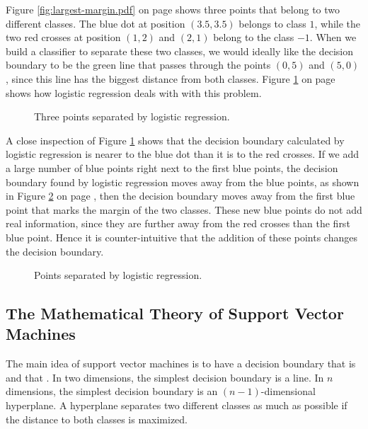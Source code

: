 Figure \ref{fig:largest-margin.pdf} on page \pageref{fig:largest-margin.pdf} shows three points that belong to
two different classes.  The blue dot at position $(3.5, 3.5)$ belongs to class $1$, while the two red crosses
at position $(1,2)$ and $(2,1)$ belong to the class $-1$.  When we build a classifier to separate these two
classes, we would ideally like the decision boundary to be the green line that passes through the points $(0,5)$ and
$(5,0)$, since this line has the biggest distance from both classes.  Figure
\ref{fig:largest-margin-logistic.pdf} on page \pageref{fig:largest-margin-logistic.pdf} shows how logistic regression
deals with with this problem.

\begin{figure}[!th]
\caption{Three points separated by logistic regression.}
\label{fig:largest-margin-logistic.pdf}
\end{figure}

A close inspection of Figure \ref{fig:largest-margin-logistic.pdf} shows that the decision boundary calculated
by logistic regression is nearer to the blue dot than it is to the red crosses.  If we add a large number of
blue points right next to the first blue points, the decision boundary found by logistic regression moves away
from the blue points, as shown in Figure \ref{fig:largest-margin-more.pdf} on
page \pageref{fig:largest-margin-more.pdf},
then the decision boundary moves away from the first blue point that marks the margin of the two classes.
These new blue points do not add real information, since they are further away from the red crosses than the
first blue point.  Hence it is counter-intuitive that the addition of these points changes the decision boundary.

\begin{figure}[!th]
\caption{Points separated by logistic regression.}
\label{fig:largest-margin-more.pdf}
\end{figure}

\subsection{The Mathematical Theory of Support Vector Machines}
The main idea of support vector machines is to have a decision boundary that is  and that
.  In two dimensions, the simplest decision boundary is a
line.  In $n$ dimensions, the simplest decision boundary is an $(n-1)$-dimensional hyperplane.
A hyperplane separates two different classes as much as possible if the distance to both classes is maximized.

